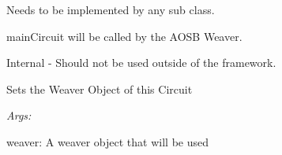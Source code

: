 \documentclass[letterpaper,10pt,english]{sphinxmanual}
\begin{document}
\begin{fulllineitems}
\begin{fulllineitems}
\begin{DUlineblock}{0em}
\item[] Needs to be implemented by any sub class.
\item[] mainCircuit will be called by the AOSB Weaver.
\end{DUlineblock}

\end{fulllineitems}


\begin{fulllineitems}
\label{modules/index:aosb.core.Circuit.setWeaver}
Internal - Should not be used outside of the framework.

Sets the Weaver Object of this Circuit

\begin{DUlineblock}{0em}
\item[] \emph{Args:}
\item[]
\begin{DUlineblock}{\DUlineblockindent}
\item[] weaver: A weaver object that will be used
\end{DUlineblock}
\end{DUlineblock}

\end{fulllineitems}


\begin{fulllineitems}
\label{modules/index:aosb.core.Circuit.after}
\end{fulllineitems}


\begin{fulllineitems}
\label{modules/index:aosb.core.Circuit.before}
\end{fulllineitems}


\begin{fulllineitems}
\label{modules/index:aosb.core.Circuit.moleculeConnection}
\end{fulllineitems}



\end{fulllineitems}
\end{document}

